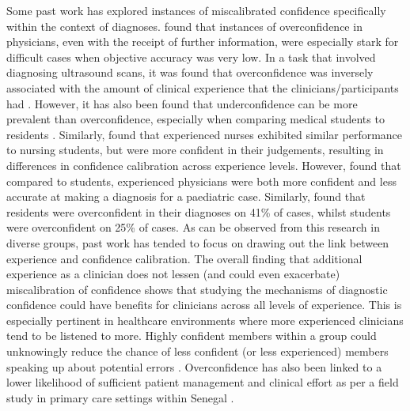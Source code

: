 \documentclass[a4paper, nobind]{templates/ociamthesis}
\begin{document}
\hfill\break
Some past work has explored instances of miscalibrated confidence specifically within the context of diagnoses. \textcite{meyer_physicians_2013} found that instances of overconfidence in physicians, even with the receipt of further information, were especially stark for difficult cases when objective accuracy was very low. In a task that involved diagnosing ultrasound scans, it was found that overconfidence was inversely associated with the amount of clinical experience that the clinicians/participants had \autocite{schoenherr_subjective_2018}. However, it has also been found that underconfidence can be more prevalent than overconfidence, especially when comparing medical students to residents \autocite{schoenherr_subjective_2018}. Similarly, \textcite{yang_nurses_2010} found that experienced nurses exhibited similar performance to nursing students, but were more confident in their judgements, resulting in differences in confidence calibration across experience levels. However, \textcite{brezis_does_2019} found that compared to students, experienced physicians were both more confident and less accurate at making a diagnosis for a paediatric case. Similarly, \textcite{friedman_physicians_2005} found that residents were overconfident in their diagnoses on 41\% of cases, whilst students were overconfident on 25\% of cases. As can be observed from this research in diverse groups, past work has tended to focus on drawing out the link between experience and confidence calibration. The overall finding that additional experience as a clinician does not lessen (and could even exacerbate) miscalibration of confidence shows that studying the mechanisms of diagnostic confidence could have benefits for clinicians across all levels of experience. This is especially pertinent in healthcare environments where more experienced clinicians tend to be listened to more. Highly confident members within a group could unknowingly reduce the chance of less confident (or less experienced) members speaking up about potential errors \autocite{hemon_speaking_2020}. Overconfidence has also been linked to a lower likelihood of sufficient patient management and clinical effort as per a field study in primary care settings within Senegal \autocite{kovacs_overconfident_2020}.
\end{document}
